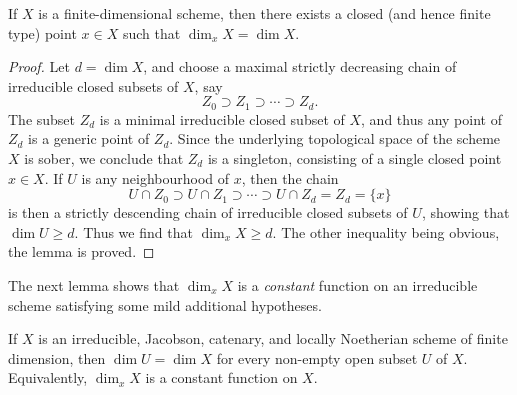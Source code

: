 \begin{lemma}
\label{lemma-dimension-achieved-by-finite-type-point}
If $X$ is a finite-dimensional scheme,
then there exists a closed (and hence finite type) point $x \in X$
such that $\dim_x X = \dim X$.
\end{lemma}

\begin{proof}
Let $d = \dim X$,
and choose a maximal strictly decreasing
chain of irreducible closed subsets of $X$,
say
\begin{equation}
\label{equation-maximal-chain}
Z_0 \supset Z_1 \supset \cdots \supset Z_d.
\end{equation}
The subset $Z_d$ is a minimal irreducible closed subset of $X$,
and thus any point of $Z_d$ is a generic point of $Z_d$.
Since the underlying topological space of the scheme $X$ is sober,
we conclude that $Z_d$ is a singleton, consisting of a single
closed point $x \in X$.
If $U$ is
any neighbourhood of $x$, then
the chain
$$
U\cap Z_0 \supset U\cap Z_1 \supset \cdots \supset U\cap Z_d = Z_d =
\{x\}
$$
is then a strictly descending chain of irreducible
closed subsets of $U$, showing that $\dim U \geq d$.
Thus we find that $\dim_x X \geq d$.  The other inequality
being obvious, the lemma is proved.
\end{proof}

\noindent
The next lemma shows that $\dim_x X$ is a {\it constant} function
on an irreducible scheme satisfying some mild additional hypotheses.

\begin{lemma}
\label{lemma-constancy-of-dimension}
If $X$ is an irreducible, Jacobson, catenary, and locally Noetherian
scheme of finite dimension,
then $\dim U = \dim X$ for every
non-empty open subset $U$ of $X$.
Equivalently, $\dim_x X$ is a constant function on $X$.
\end{lemma}

